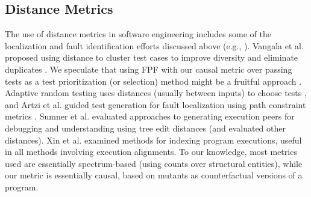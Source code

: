 \subsection{Distance Metrics}

The use of distance metrics in software engineering includes some of the localization and fault identification efforts discussed above (e.g., \cite{NearNeighbor,GroceError,ChakiLev,Liu06}).  Vangala et al. proposed using distance to cluster test cases to improve diversity and eliminate duplicates \cite{VangalaDist}.  We speculate that using FPF with our causal metric over passing tests as a test prioritization (or selection) method might be a fruitful approach \cite{YooHarman}.  Adaptive random testing uses distances (usually between inputs) to choose tests \cite{Chen,ARTChen,ISSTAART}, and Artzi et al. guided test generation for fault localization using path constraint metrics \cite{ArtziDirected}.  Sumner et al. evaluated approaches to generating execution peers for debugging and understanding \cite{Sumner2011} using tree edit distances (and evaluated other distances).  Xin et al. \cite{Xin2008} examined methods for indexing program executions, useful in all methods involving execution alignments.  To our knowledge, most metrics used are essentially spectrum-based \cite{RepsSpectra,BallConcept} (using counts over structural entities), while our metric is essentially causal, based on mutants as counterfactual \cite{LewisCause,LewisCount} versions of a program.